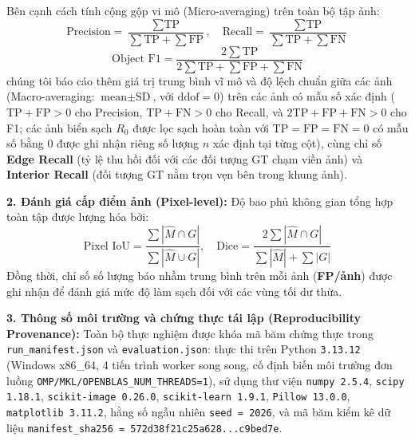 Bên cạnh cách tính cộng gộp vi mô (Micro-averaging) trên toàn bộ tập ảnh:
\begin{equation}
\text{Precision} = \frac{\sum \text{TP}}{\sum \text{TP} + \sum \text{FP}}, \quad \text{Recall} = \frac{\sum \text{TP}}{\sum \text{TP} + \sum \text{FN}}
\end{equation}
\begin{equation}
\text{Object F1} = \frac{2 \sum \text{TP}}{2 \sum \text{TP} + \sum \text{FP} + \sum \text{FN}}
\end{equation}
chúng tôi báo cáo thêm giá trị trung bình vĩ mô và độ lệch chuẩn giữa các ảnh (Macro-averaging: $\text{mean} \pm \text{SD}$, với $\text{ddof}=0$) trên các ảnh có mẫu số xác định ($\text{TP}+\text{FP}>0$ cho Precision, $\text{TP}+\text{FN}>0$ cho Recall, và $2\text{TP}+\text{FP}+\text{FN}>0$ cho F1; các ảnh biển sạch $R_0$ được lọc sạch hoàn toàn với $\text{TP}=\text{FP}=\text{FN}=0$ có mẫu số bằng $0$ được ghi nhận riêng số lượng $n$ xác định tại từng cột), cùng chỉ số \textbf{Edge Recall} (tỷ lệ thu hồi đối với các đối tượng GT chạm viền ảnh) và \textbf{Interior Recall} (đối tượng GT nằm trọn vẹn bên trong khung ảnh).

\noindent\textbf{2. Đánh giá cấp điểm ảnh (Pixel-level):}
Độ bao phủ không gian tổng hợp toàn tập được lượng hóa bởi:
\begin{equation}
\text{Pixel IoU} = \frac{\sum |\hat{M} \cap G|}{\sum |\hat{M} \cup G|}, \quad \text{Dice} = \frac{2 \sum |\hat{M} \cap G|}{\sum |\hat{M}| + \sum |G|}
\end{equation}
Đồng thời, chỉ số số lượng báo nhầm trung bình trên mỗi ảnh (\textbf{FP/ảnh}) được ghi nhận để đánh giá mức độ làm sạch đối với các vùng tối dư thừa.

\noindent\textbf{3. Thông số môi trường và chứng thực tái lập (Reproducibility Provenance):}
Toàn bộ thực nghiệm được khóa mã băm chứng thực trong \texttt{run\_manifest.json} và \texttt{evaluation.json}: thực thi trên Python \texttt{3.13.12} (Windows x86\_64, 4 tiến trình worker song song, cố định biến môi trường đơn luồng \texttt{OMP/MKL/OPENBLAS\_NUM\_THREADS=1}), sử dụng thư viện \texttt{numpy 2.5.4}, \texttt{scipy 1.18.1}, \texttt{scikit-image 0.26.0}, \texttt{scikit-learn 1.9.1}, \texttt{Pillow 13.0.0}, \texttt{matplotlib 3.11.2}, hằng số ngẫu nhiên \texttt{seed = 2026}, và mã băm kiểm kê dữ liệu \texttt{manifest\_sha256 = 572d38f21c25a628...c9bed7e}.
